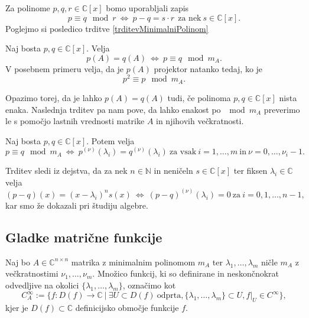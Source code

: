 \documentclass[mat1]{fmfdelo}
\newcommand{\N}{\mathbb N}
\newcommand{\C}{\mathbb C}
\begin{document}
Za polinome $p, q, r \in \C [x]$ bomo uporabljali zapis
\begin{equation*}
    p \equiv q \mod r\  \Longleftrightarrow\  p - q = s\cdot r\ \  \text{za nek}\  s\in \C [x].
\end{equation*}
Poglejmo si posledico trditve \ref{trditevMinimalniPolinom}
\begin{posledica} \label{posledicaProjekcija}
    Naj bosta $p, q \in \C [x]$. Velja
    \begin{equation*}
        p(A) = q(A)\  \Longleftrightarrow\ p \equiv q \mod m_A.
    \end{equation*}
    V posebnem primeru velja, da je $p(A)$ projektor natanko tedaj, ko je
    \begin{equation*}
        p^2 \equiv p \mod m_A.
    \end{equation*}
\end{posledica}
Opazimo torej, da je lahko $p(A) = q(A)$ tudi, če polinoma $p, q \in \C [x]$ nista enaka. Naslednja trditev pa nam pove, da lahko enakost po $\mod m_A$ preverimo le s pomočjo lastnih vrednosti matrike $A$ in njihovih večkratnosti.
\begin{trditev} \label{trditevPosploseniMinimalni}
    Naj bosta $p, q \in \C [x]$. Potem velja
    \begin{equation*}
        p \equiv q \mod m_A \ \Longleftrightarrow\  p^{(\nu)}(\lambda_i) = q^{(\nu)}(\lambda_i)\ \text{za vsak}\ i = 1, \ldots, m\ \text{in}\ \nu = 0, \ldots, \nu_i-1.
    \end{equation*}
\end{trditev}
\begin{dokaz}
    Trditev sledi iz dejstva, da za nek $n\in \N$ in neničeln $s \in \C [x]$ ter fiksen $\lambda_i \in \C$ velja
    \begin{equation*}
        (p-q)(x) = (x-\lambda_i)^n s(x) \ \Longleftrightarrow\  (p-q)^{(\nu)}(\lambda_i)=0 \ \text{za}\  i=0, 1, \ldots, n-1,
    \end{equation*}
    kar smo že dokazali pri študiju algebre.
\end{dokaz}

\subsection{Gladke matrične funkcije}

Naj bo $A \in \C^{n\times n}$ matrika z minimalnim polinomom $m_A$ ter $\lambda_1, \ldots, \lambda_m$ ničle $m_A$ z večkratnostimi $\nu_1, \ldots, \nu_m$. Množico funkcij, ki so definirane in neskončnokrat odvedljive na okolici $\{\lambda_1, \ldots, \lambda_m\}$, označimo kot
\begin{equation*}
    C_A^\infty := \{ f: D(f) \rightarrow \C\ |\ \exists U \subset D(f)\ \text{odprta}, \{\lambda_1, \ldots, \lambda_m\} \subset U, f|_U \in C^\infty \},
\end{equation*}
kjer je $D(f) \subset \C$ definicijsko območje funkcije $f$.
\end{document}
